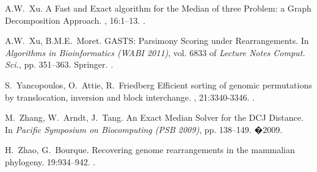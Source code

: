 \documentclass[10pt]{llncs}
\begin{document}
\begin{thebibliography}{10}
  A.W.~Xu.
  \newblock A Fast and Exact algorithm for the Median of three Problem: a Graph Decomposition Approach.
  , 16:1--13.
  .

  A.W.~Xu, B.M.E.~Moret.
  \newblock GASTS: Parsimony Scoring under Rearrangements.
  \newblock In {\em Algorithms in Bioinformatics (WABI 2011)}, vol. 6833 of {\em Lecture Notes Comput. Sci.}, pp. 351--363.
  \newblock Springer.
  .

  S.~Yancopoulos, O.~Attie, R.~Friedberg
 \newblock Efficient sorting of genomic permutations by translocation, inversion and block interchange. 
  , 21:3340-3346.
  .
 
  M.~Zhang, W.~Arndt, J.~Tang.
  \newblock An Exact Median Solver for the DCJ Distance.
  \newblock In {\em Pacific Symposium on Biocomputing (PSB 2009)}, pp. 138--149.
  \newblock�2009.


  H.~Zhao, G.~Bourque.
  \newblock Recovering genome rearrangements in the mammalian phylogeny. 
   19:934--942.
  .
\end{thebibliography}
\end{document}
